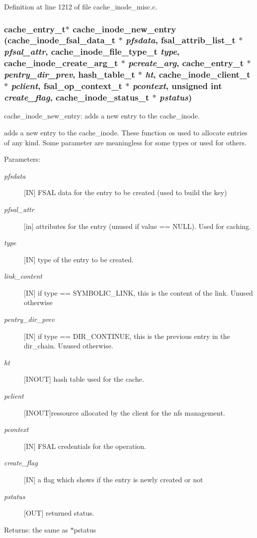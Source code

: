 Definition at line 1212 of file cache\_\-inode\_\-misc.c.
\subsubsection[{cache\_\-inode\_\-new\_\-entry}]{\setlength{\rightskip}{0pt plus 5cm}cache\_\-entry\_\-t$\ast$ cache\_\-inode\_\-new\_\-entry (cache\_\-inode\_\-fsal\_\-data\_\-t $\ast$ {\em pfsdata}, \/  fsal\_\-attrib\_\-list\_\-t $\ast$ {\em pfsal\_\-attr}, \/  cache\_\-inode\_\-file\_\-type\_\-t {\em type}, \/  cache\_\-inode\_\-create\_\-arg\_\-t $\ast$ {\em pcreate\_\-arg}, \/  cache\_\-entry\_\-t $\ast$ {\em pentry\_\-dir\_\-prev}, \/  hash\_\-table\_\-t $\ast$ {\em ht}, \/  cache\_\-inode\_\-client\_\-t $\ast$ {\em pclient}, \/  fsal\_\-op\_\-context\_\-t $\ast$ {\em pcontext}, \/  unsigned int {\em create\_\-flag}, \/  cache\_\-inode\_\-status\_\-t $\ast$ {\em pstatus})}\label{cache__inode__misc_8c_8392006e0fb4aea7143cfd950e91a74a}


cache\_\-inode\_\-new\_\-entry: adds a new entry to the cache\_\-inode.

adds a new entry to the cache\_\-inode. These function os used to allocate entries of any kind. Some parameter are meaningless for some types or used for others.

\begin{Desc}
\item[Parameters:]
\begin{description}
\item[{\em pfsdata}][IN] FSAL data for the entry to be created (used to build the key) \item[{\em pfsal\_\-attr}][in] attributes for the entry (unused if value == NULL). Used for caching. \item[{\em type}][IN] type of the entry to be created. \item[{\em link\_\-content}][IN] if type == SYMBOLIC\_\-LINK, this is the content of the link. Unused otherwise \item[{\em pentry\_\-dir\_\-prev}][IN] if type == DIR\_\-CONTINUE, this is the previous entry in the dir\_\-chain. Unused otherwise. \item[{\em ht}][INOUT] hash table used for the cache. \item[{\em pclient}][INOUT]ressource allocated by the client for the nfs management. \item[{\em pcontext}][IN] FSAL credentials for the operation. \item[{\em create\_\-flag}][IN] a flag which shows if the entry is newly created or not \item[{\em pstatus}][OUT] returned status.\end{description}
\end{Desc}
\begin{Desc}
\item[Returns:]the same as $\ast$pstatus \end{Desc}


